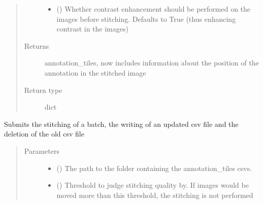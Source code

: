 \documentclass[letterpaper,10pt,english]{sphinxmanual}
\begin{document}
\begin{fulllineitems}
\begin{fulllineitems}
\begin{quote}
\begin{description}
\begin{itemize}
\item {} 
 () \textendash{} Whether contrast enhancement should be performed on the images before stitching.
Defaults to True (thus enhancing contrast in the images)

\end{itemize}

\item[{Returns}] \leavevmode
annotation\_tiles, now includes information about the position of the annotation in the stitched image

\item[{Return type}] \leavevmode
dict

\end{description}\end{quote}

\end{fulllineitems}


\begin{fulllineitems}
\label{\detokenize{index:stitch_MAPS_annotations.Stitcher.stitch_batch}}
Submits the stitching of a batch, the writing of an updated csv file and the deletion of the old csv file
\begin{quote}\begin{description}
\item[{Parameters}] \leavevmode\begin{itemize}
\item {} 
 () \textendash{} The path to the folder containing the annotation\_tiles csvs.

\item {} 
 () \textendash{} Threshold to judge stitching quality by. If images would be moved more than this
threshold, the stitching is not performed


\end{itemize}
\end{description}
\end{quote}
\end{fulllineitems}
\end{fulllineitems}
\end{document}
